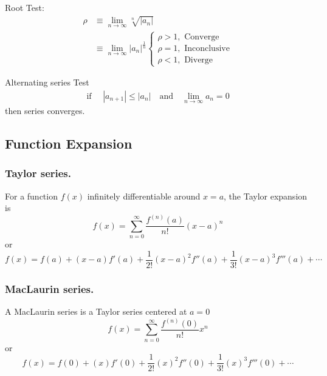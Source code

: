 \documentclass[../../../main.tex]{subfiles}
\begin{document}
Root Test:
\begin{align*}
    \rho&\equiv\lim_{n\to \infty} \sqrt[ n]{|a_n|}\\
    &\equiv \lim_{n\to \infty} |a_n|^{\frac{1}{n}}
    \begin{cases}
        \rho > 1,\textrm{ Converge}\\\rho = 1,\textrm{ Inconclusive}\\\rho < 1,\textrm{ Diverge}
    \end{cases}
\end{align*}

Alternating series Test
\begin{align*}
    \textrm{if }\quad|a_{n+1}|\leq|a_n|\quad \textrm{and} \quad\lim_{n\to \infty} a_n=0
\end{align*}
then series converges.

\subsection{Function Expansion}
\subsubsection{Taylor series.}
For a function $f(x)$ infinitely differentiable around $x=a$, the Taylor expansion is
\begin{equation*}
    f(x) = \sum_{n=0}^{\infty} \frac{f^{(n)}(a)}{n!}(x-a)^n
\end{equation*}
or 
\begin{equation*}
    f(x)= f(a)+(x-a)f'(a)+\frac{1}{2!}(x-a)^2f''(a)+\frac{1}{3!}(x-a)^3f'''(a)+\cdots    
\end{equation*}

\subsubsection{MacLaurin series.}
A MacLaurin series is a Taylor series centered at $a=0$
\begin{equation*}
    f(x) = \sum_{n=0}^{\infty} \frac{f^{(n)}(0)}{n!}x^n
\end{equation*}
or 
\begin{equation*}
    f(x) = f(0)+(x)f'(0)+\frac{1}{2!}(x)^2f''(0)+\frac{1}{3!}(x)^3f'''(0)+\cdots    
\end{equation*}
\end{document}
